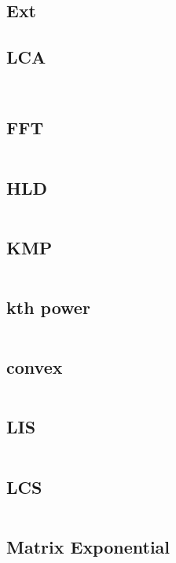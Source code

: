 \documentclass{article}
\begin{document}
\begin{multicols}{2}
\section{Ext}
\subsection{LCA}
\inputminted[linenos, breaklines]{cpp}{codes/lca.txt}
\inputminted[linenos, breaklines]{cpp}{codes/lca2.txt}

\subsection{FFT}
\inputminted[linenos, breaklines]{cpp}{codes/fft1.txt}

\subsection{HLD}
\inputminted[linenos, breaklines]{cpp}{codes/HLD.txt}

\subsection{KMP}
\inputminted[linenos, breaklines]{cpp}{codes/kmp.txt}

\subsection{kth power}
\inputminted[linenos, breaklines]{cpp}{codes/kthpower.txt}

\subsection{convex}
\inputminted[linenos, breaklines]{cpp}{codes/convex.txt}

\subsection{LIS}
\inputminted[linenos, breaklines]{cpp}{codes/LIS.txt}

\subsection{LCS}
\inputminted[linenos, breaklines]{cpp}{codes/lcs.txt}

\subsection{Matrix Exponential}
\inputminted[linenos, breaklines]{cpp}{codes/matrixexpo.txt}

\end{multicols}
\end{document}
